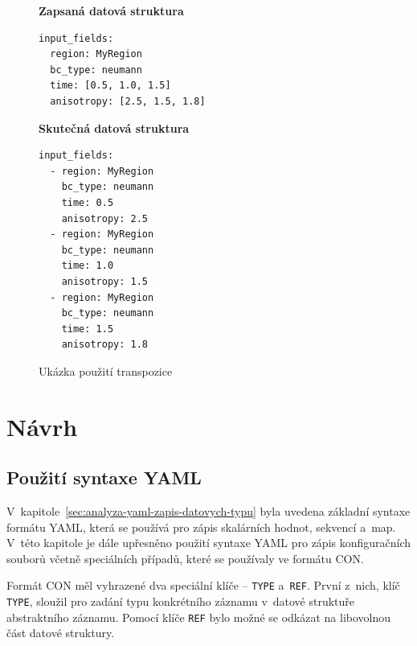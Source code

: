 \documentclass[FM,bw,DP]{tulthesis}
\begin{document}
\begin{figure}[ht]
\singlespacing
\begin{minipage}[t]{0.5\linewidth}
\vspace{0pt}
\textbf{Zapsaná datová struktura}\\
\vspace{-5pt}
\begin{lstlisting}
input_fields: 
  region: MyRegion
  bc_type: neumann
  time: [0.5, 1.0, 1.5]
  anisotropy: [2.5, 1.5, 1.8]
\end{lstlisting}
\end{minipage}
\hfill
\begin{minipage}[t]{0.45\linewidth}
\vspace{0pt}
\textbf{Skutečná datová struktura}\\
\vspace{-5pt}
\begin{lstlisting}
input_fields: 
  - region: MyRegion
    bc_type: neumann
    time: 0.5
    anisotropy: 2.5
  - region: MyRegion
    bc_type: neumann
    time: 1.0
    anisotropy: 1.5
  - region: MyRegion
    bc_type: neumann
    time: 1.5
    anisotropy: 1.8
\end{lstlisting}
\vspace*{-20pt}
\end{minipage}
\onehalfspacing
\caption{Ukázka použití transpozice}
\label{img:transposition_code_example}
\end{figure}

\chapter{Návrh}


\section{Použití syntaxe YAML}

V~kapitole~\ref{sec:analyza-yaml-zapis-datovych-typu} byla uvedena základní syntaxe formátu \gls{YAML}, která se používá pro zápis skalárních hodnot, sekvencí a~map. V~této kapitole je dále upřesněno použití syntaxe \gls{YAML} pro zápis konfiguračních souborů včetně speciálních případů, které se používaly ve formátu \gls{CON}.

Formát \gls{CON} měl vyhrazené dva speciální klíče -- \texttt{TYPE} a~\texttt{REF}. První z~nich, klíč \texttt{TYPE}, sloužil pro zadání typu konkrétního záznamu v~datové struktuře abstraktního záznamu. Pomocí klíče \texttt{REF} bylo možné se odkázat na libovolnou část datové struktury.
\end{document}
